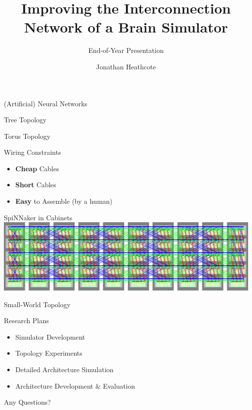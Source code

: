 \documentclass[t]{beamer}
\title{Improving the Interconnection Network of a Brain Simulator}
\subtitle{End-of-Year Presentation}
\author{Jonathan Heathcote}
\date{}
\begin{document}
	
	\maketitle
	
	\begin{frame}{(Artificial) Neural Networks}
		\center
		\only<1>{}%
		\only<2>{}%
	\end{frame}
	
	\begin{frame}{Tree Topology}
		\center
		
	\end{frame}
	
	\begin{frame}{Torus Topology}
		\center
		
	\end{frame}
	
	\begin{frame}{Wiring Constraints}
		\begin{itemize}
			\item \textbf{Cheap} Cables
			\item \textbf{Short} Cables
			\item \textbf{Easy} to Assemble (by a human)
		\end{itemize}
	\end{frame}
	
	\begin{frame}{SpiNNaker in Cabinets}
		\center
		\includegraphics[width=\textwidth]{figures/spinnaker106}
	\end{frame}
	
	\begin{frame}{Small-World Topology}
		\only<1>{\hspace{2cm}}%
		\only<2>{\hspace{2cm}}%
	\end{frame}
	
	\begin{frame}{Research Plans}
		\begin{itemize}
			\item Simulator Development
			\item Topology Experiments
			\item Detailed Architecture Simulation
			\item Architecture Development \& Evaluation
		\end{itemize}
	\end{frame}
	
	\begin{darkframes}
		\begin{frame}{}
			\vspace{3cm}
			\begin{center}
				\Huge{}Any Questions?
			\end{center}
		\end{frame}
	\end{darkframes}
	
\end{document}
